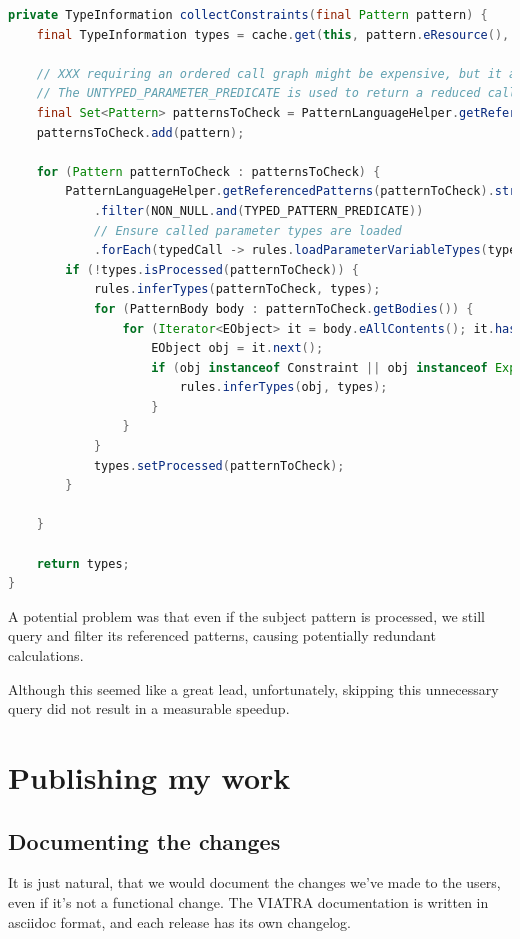 \documentclass[11pt,a4paper,oneside]{report}
\begin{document}
\begin{lstlisting}[caption={Original source code of \texttt{collectConstraints}}, language=java]
private TypeInformation collectConstraints(final Pattern pattern) {
    final TypeInformation types = cache.get(this, pattern.eResource(), () -> new TypeInformation(typeSystem));

    // XXX requiring an ordered call graph might be expensive, but it avoids inconsistent errors during type inference
    // The UNTYPED_PARAMETER_PREDICATE is used to return a reduced call graph where pattern with only declared types are (transitively) ignored.
    final Set<Pattern> patternsToCheck = PatternLanguageHelper.getReferencedPatternsTransitive(pattern, true, NON_NULL.and(UNTYPED_PATTERN_PREDICATE));
    patternsToCheck.add(pattern);

    for (Pattern patternToCheck : patternsToCheck) {
        PatternLanguageHelper.getReferencedPatterns(patternToCheck).stream()
            .filter(NON_NULL.and(TYPED_PATTERN_PREDICATE))
            // Ensure called parameter types are loaded
            .forEach(typedCall -> rules.loadParameterVariableTypes(typedCall, types));
        if (!types.isProcessed(patternToCheck)) {
            rules.inferTypes(patternToCheck, types);
            for (PatternBody body : patternToCheck.getBodies()) {
                for (Iterator<EObject> it = body.eAllContents(); it.hasNext();) {
                    EObject obj = it.next();
                    if (obj instanceof Constraint || obj instanceof Expression) {
                        rules.inferTypes(obj, types);
                    }
                }
            }
            types.setProcessed(patternToCheck);
        }

    }

    return types;
}
\end{lstlisting}

A potential problem was that even if the subject pattern is processed, we still
query and filter its referenced patterns, causing potentially redundant
calculations.

Although this seemed like a great lead, unfortunately, skipping this unnecessary
query did not result in a measurable speedup.

\chapter{Publishing my work}
\section{Documenting the changes}
It is just natural, that we would document the changes we've made to the users,
even if it's not a functional change. The VIATRA documentation is written in
asciidoc format, and each release has its own changelog.
\end{document}
